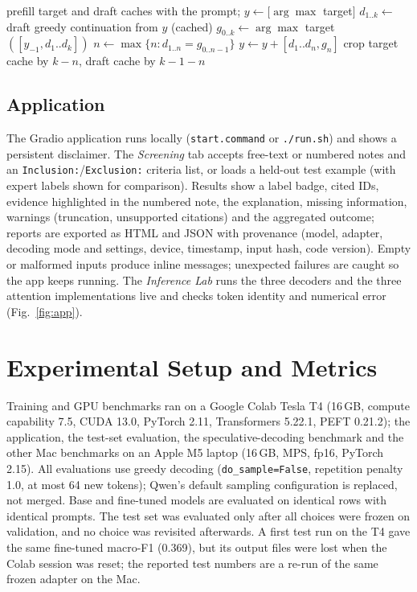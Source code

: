 \documentclass[conference]{IEEEtran}
\begin{document}
\begin{algorithm}[t]
\caption{Greedy speculative decoding}
\label{alg:spec}
\begin{algorithmic}[1]
\State prefill target and draft caches with the prompt; $y \gets [\arg\max$ target$]$
\State $d_{1..k} \gets$ draft greedy continuation from $y$ (cached)
\State $g_{0..k} \gets \arg\max$ target$([y_{-1}, d_1..d_k])$ 
\State $n \gets \max\{n : d_{1..n} = g_{0..n-1}\}$
\State $y \gets y + [d_1..d_n, g_n]$
\State crop target cache by $k-n$, draft cache by $k-1-n$
\EndWhile
\end{algorithmic}
\end{algorithm}

\subsection{Application}
The Gradio application runs locally (\texttt{start.command} or \texttt{./run.sh}) and shows a persistent disclaimer. The \emph{Screening} tab accepts free-text or numbered notes and an \texttt{Inclusion:}/\texttt{Exclusion:} criteria list, or loads a held-out test example (with expert labels shown for comparison). Results show a label badge, cited IDs, evidence highlighted in the numbered note, the explanation, missing information, warnings (truncation, unsupported citations) and the aggregated outcome; reports are exported as HTML and JSON with provenance (model, adapter, decoding mode and settings, device, timestamp, input hash, code version). Empty or malformed inputs produce inline messages; unexpected failures are caught so the app keeps running. The \emph{Inference Lab} runs the three decoders and the three attention implementations live and checks token identity and numerical error (Fig.~\ref{fig:app}).

\section{Experimental Setup and Metrics}
Training and GPU benchmarks ran on a Google Colab Tesla T4 (16\,GB, compute capability 7.5, CUDA 13.0, PyTorch 2.11, Transformers 5.22.1, PEFT 0.21.2); the application, the test-set evaluation, the speculative-decoding benchmark and the other Mac benchmarks on an Apple M5 laptop (16\,GB, MPS, fp16, PyTorch 2.15). All evaluations use greedy decoding (\texttt{do\_sample=False}, repetition penalty 1.0, at most 64 new tokens); Qwen's default sampling configuration is replaced, not merged. Base and fine-tuned models are evaluated on identical rows with identical prompts. The test set was evaluated only after all choices were frozen on validation, and no choice was revisited afterwards. A first test run on the T4 gave the same fine-tuned macro-F1 (0.369), but its output files were lost when the Colab session was reset; the reported test numbers are a re-run of the same frozen adapter on the Mac.
\end{document}
